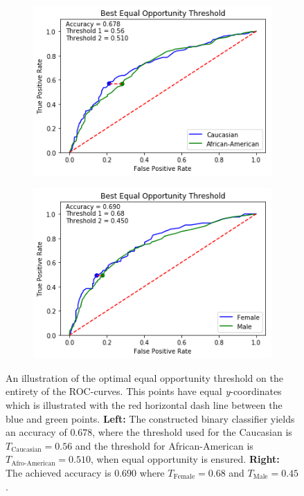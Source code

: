 \documentclass[11pt, fleqn, titlepage]{article}
\begin{document}
	\begin{figure}[H]
		\begin{subfigure}{0.5\textwidth}
			\centering
			\includegraphics[width=0.9\linewidth]{"imgs/Equal Opportunity Optimal"}
		\end{subfigure}
		\begin{subfigure}{0.5\textwidth}
			\centering
			\includegraphics[width=0.9\linewidth]{"imgs/Equal Opportunity Optimal_sex"}
		\end{subfigure}	
		\caption{An illustration of the optimal equal opportunity threshold on the entirety of the ROC-curves. This points have equal \textit{y}-coordinates which is illustrated with the red horizontal dash line between the blue and green points. \textbf{Left:} The constructed binary classifier yields an accuracy of $ 0.678 $, where the threshold used for the Caucasian is $T_{\text{Caucasian}}= 0.56 $ and the threshold for African-American is $ T_{\text{Afro-American}}=0.510 $, when equal opportunity is ensured. \textbf{Right:} The achieved accuracy is $0.690$ where $T_{\text{Female}}= 0.68$ and $T_{\text{Male}}= 0.45$.}
		\label{fig:equal-opportunity-optimal}
	\end{figure}
	
\end{document}
